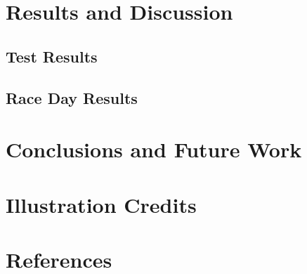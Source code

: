 \documentclass[12pt]{article}
\begin{document}
\section{Results and Discussion}
\subsection{Test Results}

\subsection{Race Day Results}

\section{Conclusions and Future Work}

\section{Illustration Credits}

\section{References}
\end{document}
